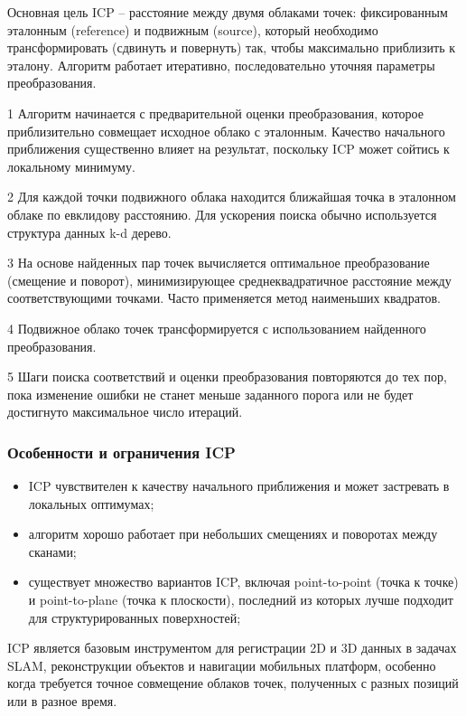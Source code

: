Основная цель ICP -- расстояние между двумя облаками точек:
фиксированным эталонным (reference) и подвижным (source), который необходимо
трансформировать (сдвинуть и повернуть) так, чтобы максимально приблизить к
эталону. Алгоритм работает итеративно, последовательно уточняя параметры
преобразования.

1 Алгоритм начинается с предварительной оценки преобразования, которое
приблизительно совмещает исходное облако с эталонным. Качество начального
приближения существенно влияет на результат, поскольку ICP может сойтись к
локальному минимуму.
    
2 Для каждой точки подвижного облака находится ближайшая точка в эталонном
облаке по евклидову расстоянию. Для ускорения поиска обычно используется
структура данных k-d дерево.
    
3 На основе найденных пар точек вычисляется оптимальное преобразование (смещение
и поворот), минимизирующее среднеквадратичное расстояние между соответствующими
точками. Часто применяется метод наименьших квадратов.
    
4 Подвижное облако точек трансформируется с использованием найденного
преобразования.
    
5 Шаги поиска соответствий и оценки преобразования повторяются до тех пор, пока
изменение ошибки не станет меньше заданного порога или не будет достигнуто
максимальное число итераций.

\subsubsection{Особенности и ограничения ICP}
\begin{itemize}
	\item ICP чувствителен к качеству начального приближения и может застревать
		в локальных оптимумах;
	\item алгоритм хорошо работает при небольших смещениях и поворотах между
		сканами;
	\item существует множество вариантов ICP, включая point-to-point (точка к
		точке) и point-to-plane (точка к плоскости), последний из которых лучше
		подходит для структурированных поверхностей;
\end{itemize}

ICP является базовым инструментом для регистрации 2D и 3D данных в задачах SLAM,
реконструкции объектов и навигации мобильных платформ, особенно когда требуется
точное совмещение облаков точек, полученных с разных позиций или в разное время.

